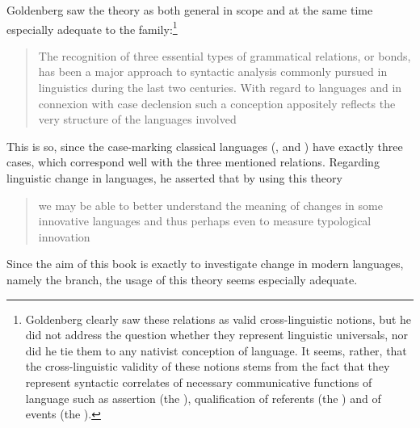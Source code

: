 Goldenberg saw the theory as both general in scope and at the same time especially adequate to the  family:\footnote{Goldenberg clearly saw these relations as valid cross-linguistic notions, but he  did not address the question whether they represent linguistic universals, nor did he tie them to any nativist conception of language. It seems, rather, that  the cross-linguistic validity of these notions stems from the fact that they represent syntactic correlates of necessary communicative functions of language such as assertion (the ), qualification of referents (the ) and of events (the ).} 

 \blockquote[{\citealt[142]{GoldenbergSemitic}}][.]{The recognition of three essential types of grammatical relations, or bonds, has been a major approach to syntactic analysis commonly pursued in linguistics during the last two centuries. With regard to  languages and in connexion with case declension such a conception appositely reflects the very structure of the languages involved} This is so, since the case-marking classical  languages (\CArab,  and ) have exactly three cases, which correspond well with the three mentioned relations. Regarding linguistic change in  languages, he asserted that by using this theory  \blockquote[{\citealt[142]{GoldenbergSemitic}}][.]{we may be able to better understand the meaning of changes in some innovative languages and thus perhaps even to measure typological innovation}. Since the aim of this book is exactly to investigate change in modern  languages, namely the  branch, the usage of this theory seems especially adequate. 

